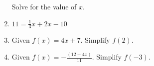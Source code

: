 \documentclass[12pt, oneside]{article}
\begin{document}
\begin{enumerate}
\vspace{3cm}
Solve for the value of $x$.

\item   $11=\frac{1}{3}x+2x-10$ \vspace{3cm}


\item Given $f(x)=4x+7$. Simplify $f(2)$. \vspace{4cm}
\item Given $\displaystyle f(x)=-\frac{(12+4x)}{11}$. Simplify $f(-3)$.

\newpage

\end{enumerate}
\end{document}
